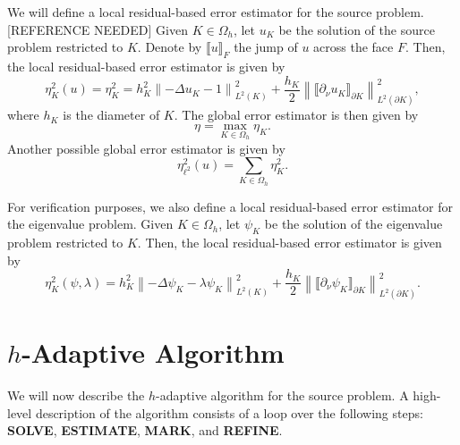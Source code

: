 \documentclass[12pt]{amsart}
\begin{document}
We will define a local residual-based error estimator for the source problem. [REFERENCE NEEDED]
Given \(K \in \Omega_h\), let \(u_K\) be the solution of the source problem restricted to \(K\).
Denote by \(\llbracket u \rrbracket_F\) the jump of \(u\) across the face \(F\).
Then, the local residual-based error estimator is given by
\begin{equation}
    \label{eq:source_error_estimator}
    \eta_K^2(u) =
    \eta_K^2 = h_K^2 \left\lVert -\Delta u_K - 1 \right\rVert_{L^2(K)}^2
         + \frac{h_K}{2} \left\lVert \llbracket \partial_\nu u_K \rrbracket_{\partial K} \right\rVert_{L^2(\partial K)}^2,
\end{equation}
where \(h_K\) is the diameter of \(K\).
The global error estimator is then given by
\begin{equation}
    \label{eq:source_global_error_estimator}
    \eta = \max_{K \in \Omega_h} \eta_K.
\end{equation}
Another possible global error estimator is given by
\begin{equation}
    \label{eq:source_global_error_estimator_alt}
    \eta^2_{\ell^2}(u) =
    \sum_{K \in \Omega_h} \eta_K^2.
\end{equation}

For verification purposes, we also define a local residual-based error estimator for the eigenvalue problem.
Given \(K \in \Omega_h\), let \(\psi_K\) be the solution of the eigenvalue problem restricted to \(K\).
Then, the local residual-based error estimator is given by
\begin{equation}
    \label{eq:eigenvalue_error_estimator}
    \eta_K^2(\psi, \lambda) =
    h_K^2 \left\lVert -\Delta \psi_K - \lambda \psi_K \right\rVert_{L^2(K)}^2
        + \frac{h_K}{2} \left\lVert \llbracket \partial_\nu \psi_K \rrbracket_{\partial K} \right\rVert_{L^2(\partial K)}^2.
\end{equation}

\section{\(h\)-Adaptive Algorithm}

We will now describe the \(h\)-adaptive algorithm for the source problem.
A high-level description of the algorithm consists of a loop over the following steps:
\textbf{SOLVE}, \textbf{ESTIMATE}, \textbf{MARK}, and \textbf{REFINE}.
\end{document}
